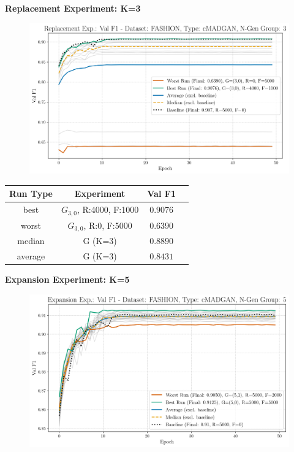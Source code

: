 \noindent\textbf{Replacement Experiment: K=3}
\begin{figure}[htbp]
	\centering
	\includegraphics[width=.85\textwidth]{abb/strat_classifier_performance/FASHION_STRATIFIED_CLASSIFIERS_cMADGAN_NEW/replacement_experiments/val_f1_score_cMADGAN_FASHION_n_gen_3_all.png}
	\label{fig:app_strat_class_performance_replacement_exp._val_f1_score_3}
\end{figure}
\begin{table}[H]
	\vspace{-1em}
	\centering
	\begin{tabular}{|c|c|c|c|}
		\hline
		Run Type & Experiment & Val F1 \\ \hline
		best & \(G_{3, 0}\), R:4000, F:1000 & $0.9076$\\ \hline
		worst & \(G_{3, 0}\), R:0, F:5000 & $0.6390$\\ \hline
		median & G (K=3) & $0.8890$\\ \hline
		average & G (K=3) & $0.8431$
		\\ \hline
	\end{tabular}
\end{table}
\newpage
\noindent\textbf{Expansion Experiment: K=5}
\begin{figure}[htbp]
	\centering
	\includegraphics[width=.85\textwidth]{abb/strat_classifier_performance/FASHION_STRATIFIED_CLASSIFIERS_cMADGAN_NEW/expansion_experiments/val_f1_score_cMADGAN_FASHION_n_gen_5_all.png}
	\label{fig:app_strat_class_performance_expansion_exp._val_f1_score_5}
\end{figure}
